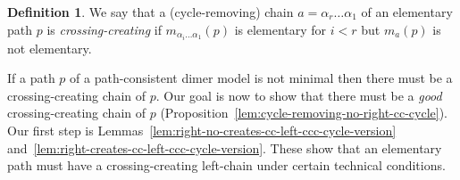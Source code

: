 \documentclass{article}
\theoremstyle{definition}
\newtheorem{defn}[thm]{Definition}
\begin{document}
\begin{defn}
	We say that a (cycle-removing) chain $a=\alpha_r\dots\alpha_1$ of an elementary path $p$ is \textit{crossing-creating} if $m_{\alpha_i\dots\alpha_1}(p)$ is elementary for $i<r$ but $m_a(p)$ is not elementary.
\end{defn}

If a path $p$ of a path-consistent dimer model is not minimal then there must be a crossing-creating chain of $p$. Our goal is now to show that there must be a \textit{good} crossing-creating chain of $p$ (Proposition~\ref{lem:cycle-removing-no-right-cc-cycle}). Our first step is Lemmas~\ref{lem:right-no-creates-cc-left-ccc-cycle-version} and~\ref{lem:right-creates-cc-left-ccc-cycle-version}. These show that an elementary path must have a crossing-creating left-chain under certain technical conditions.
\end{document}
